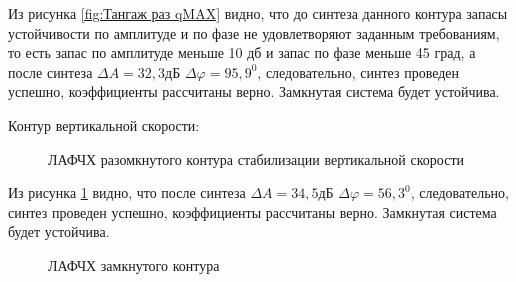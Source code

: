 Из рисунка \ref{fig:Тангаж раз qMAX} видно, что до синтеза данного контура запасы устойчивости по амплитуде и по фазе не удовлетворяют заданным требованиям, то есть запас по амплитуде меньше 10 дб и запас по фазе меньше 45 град, а после синтеза $\Delta A = 32,3 $дБ $\Delta \varphi = 95,9^0$, следовательно, синтез проведен успешно, коэффициенты рассчитаны верно. Замкнутая система будет устойчива.  

\begin{center}
    Контур вертикальной скорости:
\end{center}

\begin{figure}[H]
    \caption{ЛАФЧХ разомкнутого контура стабилизации вертикальной скорости}
    \label{fig:Вертикальная скорость раз qMAX}
\end{figure}

Из рисунка \ref{fig:Вертикальная скорость раз qMAX} видно, что после синтеза $\Delta A = 34,5 $дБ $\Delta \varphi = 56,3^0$, следовательно, синтез проведен успешно, коэффициенты рассчитаны верно. Замкнутая система будет устойчива.  

\begin{figure}[H]
    \caption{ЛАФЧХ замкнутого контура }
    \label{fig:Вертикальная скорость зам qMAX}
\end{figure}


